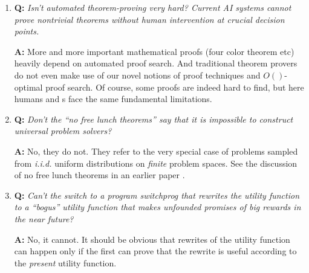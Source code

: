 \begin{enumerate}
{\bf A:} 
Many physicists and other scientists
(exceptions: \cite{Zuse:69,Schmidhuber:97brauer})
actually seem to assume the real world
makes use of all the real numbers, most
of which are incomputable.
Nevertheless,
theorems and proofs are just finite symbol strings,
and all treatises of physics contain only computable 
axioms and theorems, even when some of the theorems
can be interpreted as making statements about uncountably 
many objects, such as all the real numbers. (Note though that
the L\"{o}wenheim-Skolem Theorem \cite{Loewenheim:15,Skolem:19}
implies that any first order theory with an uncountable model
such as the real numbers also has a countable model.) 
Generally speaking, formal descriptions of non-computable objects
do {\em not at all} present a fundamental problem---they 
may still allow for finding a strategy
that provably maximizes utility. If so, a \gm
can exploit this. If not, then humans will not
have a fundamental advantage over \gmn s.

\item
{\bf Q:} {\em 
Isn't automated theorem-proving 
very hard?  Current AI systems cannot prove 
nontrivial theorems without human intervention 
at crucial decision points.
}

{\bf A:} 
More and more important mathematical proofs (four color 
theorem etc) heavily depend on automated proof search.
And traditional theorem provers do not even make use of
our novel notions of proof techniques and $O()$-optimal
proof search.  Of course, some proofs are indeed hard to find, 
but here humans and \gmn s face the 
same fundamental limitations.


\item
{\bf Q:} {\em Don't the
``no free lunch theorems'' \cite{Wolpert:97}
say that it is 
impossible to construct universal problem solvers?
}

{\bf A:} 
No, they do not. They refer to the very special 
case of problems sampled from {\em i.i.d.} uniform 
distributions on {\em finite} problem spaces. 
See the discussion of no free lunch theorems
in an earlier paper \cite{Schmidhuber:04oops}.

\item
{\bf Q:} {\em 
Can't the \gm
switch to a program {\em switchprog} that rewrites 
the utility function to a ``bogus'' utility function that 
makes unfounded promises of big rewards in the near future?
}

{\bf A:} 
No, it cannot. It should be obvious that rewrites
of the utility function can happen only if
the \gm first can prove that the rewrite
is useful according to the {\em present} utility function.


\end{enumerate}

